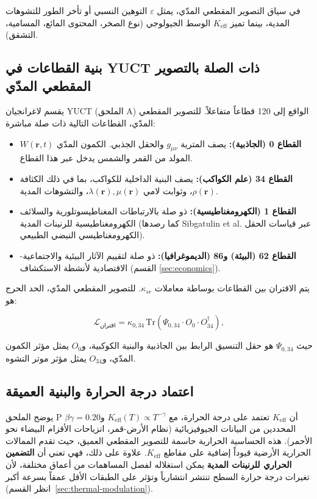 \documentclass[12pt,a4paper]{article}
\newcommand{\Keff}{K_{\mathrm{eff}}}
\newcommand{\eps}{\varepsilon}
\theoremstyle{remark}
\begin{document}
	في سياق التصوير المقطعي المدّي، يمثل \(\eps\) التوهين النسبي أو تأخر الطور للتشوهات المدية، بينما تميز \(\Keff\) الوسط الجيولوجي (نوع الصخر، المحتوى المائع، المسامية، التشقق).
	
	\subsection{بنية القطاعات في YUCT ذات الصلة بالتصوير المقطعي المدّي}
	
	يقسم لاغرانجيان YUCT (الملحق A) الواقع إلى 120 قطاعاً متفاعلاً. للتصوير المقطعي المدّي، القطاعات التالية ذات صلة مباشرة:
	
	\begin{itemize}
		\item \textbf{القطاع 0 (الجاذبية):} يصف المترية \(g_{\mu\nu}\) والحقل الجذبي. الكمون المدّي \(W(\mathbf{r},t)\) المولد من القمر والشمس يدخل عبر هذا القطاع.
		\item \textbf{القطاع 34 (علم الكواكب):} يصف البنية الداخلية للكواكب، بما في ذلك الكثافة \(\rho(\mathbf{r})\)، وثوابت لامي \(\lambda(\mathbf{r}), \mu(\mathbf{r})\)، والتشوهات المدية.
		\item \textbf{القطاع 1 (الكهرومغناطيسية):} ذو صلة بالارتباطات المغناطيسوتلورية والسلائف الكهرومغناطيسية للرنينات المدية (كما رصدها Sibgatulin et al. \cite{Sibgatulin2014} عبر قياسات الحقل الكهرومغناطيسي النبضي الطبيعي).
		\item \textbf{القطاع 62 (البيئة) و86 (الديموغرافيا):} ذو صلة لتقييم الآثار البيئية والاجتماعية-الاقتصادية لأنشطة الاستكشاف (القسم \ref{sec:economics}).
	\end{itemize}
	
	يتم الاقتران بين القطاعات بوساطة معاملات \(\kappa_{sr}\). للتصوير المقطعي المدّي، الحد الحرج هو:
	
	\begin{equation}
		\mathcal{L}_{\text{اقتران}} = \kappa_{0,34} \, \mathrm{Tr}\left(\Psi_{0,34} \cdot O_0 \cdot O_{34}^\dagger\right),
		\label{eq:coupling}
	\end{equation}
	
	حيث \(\Psi_{0,34}\) هو حقل التنسيق الرابط بين الجاذبية والبنية الكوكبية، و\(O_0\) يمثل مؤثر الكمون المدّي، و\(O_{34}\) يمثل مؤثر موتر التشوه.
	
	\subsection{اعتماد درجة الحرارة والبنية العميقة}
	
	يوضح الملحق P أن \(\Keff\) تعتمد على درجة الحرارة، مع \(\Keff(T) \propto T^{-\gamma}\) و\(\beta\gamma = 0.20\) المحددين من البيانات الجيوفيزيائية (نظام الأرض-قمر، انزياحات الأقزام البيضاء نحو الأحمر). هذه الحساسية الحرارية حاسمة للتصوير المقطعي العميق، حيث تقدم الممالات الحرارية الأرضية قيوداً إضافية على مقاطع \(K_{\mathrm{eff}}\). علاوة على ذلك، فهي تعني أن \textbf{التضمين الحراري للرنينات المدية} يمكن استغلاله لفصل المساهمات من أعماق مختلفة، لأن تغيرات درجة حرارة السطح تنتشر انتشارياً وتؤثر على الطبقات الأقل عمقاً بسرعة أكبر (انظر القسم~\ref{sec:thermal-modulation}).
	
\end{document}
